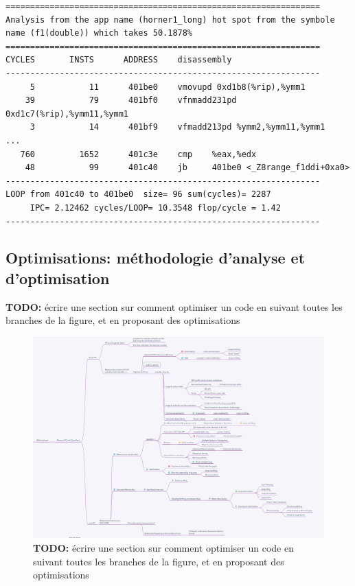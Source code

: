 \begin{lstlisting}[language={},caption=L'outil \textit{Oprofile++} permet d'extraire le code assembleur et d'y associer le compteur de cycle,label={lst:oprofileex}, 
  frame=tb]
================================================================
Analysis from the app name (horner1_long) hot spot from the symbole name (f1(double)) which takes 50.1878% 
================================================================
CYCLES       INSTS      ADDRESS    disassembly
----------------------------------------------------------------
     5           11      401be0    vmovupd 0xd1b8(%rip),%ymm1
    39           79      401bf0    vfnmadd231pd 0xd1c7(%rip),%ymm11,%ymm1
     3           14      401bf9    vfmadd213pd %ymm2,%ymm11,%ymm1
...
   760         1652      401c3e    cmp    %eax,%edx
    48           99      401c40    jb     401be0 <_Z8range_f1ddi+0xa0>
----------------------------------------------------------------
LOOP from 401c40 to 401be0  size= 96 sum(cycles)= 2287 
     IPC= 2.12462 cycles/LOOP= 10.3548 flop/cycle = 1.42 
----------------------------------------------------------------
\end{lstlisting}





\subsection{Optimisations: méthodologie d'analyse et d'optimisation}

\textbf{TODO: } écrire une section sur comment optimiser un code en suivant toutes les branches de la figure, et en proposant des optimisations

\begin{figure}
    \center
    \includegraphics[width=18cm]{images/methodologie_optimisation.png}
    \caption{\label{pic:methodologie_optimisation} \textbf{TODO: } écrire une section sur comment optimiser un code en suivant toutes les branches de la figure, et en proposant des optimisations}
\end{figure}



